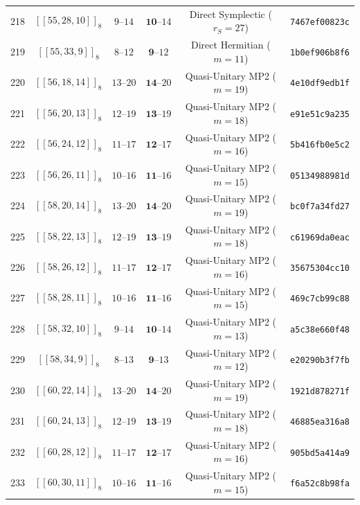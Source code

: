 \documentclass[11pt,a4paper]{article}
\theoremstyle{remark}
\begin{document}
{\begin{longtable}{@{}rccccl@{}}
218 & $[[55,28,10]]_{8}$ & $9\text{--}14$ & $\mathbf{10}\text{--}14$ & Direct Symplectic ($r_S=27$) & \texttt{7467ef00823c} \\
219 & $[[55,33,9]]_{8}$ & $8\text{--}12$ & $\mathbf{9}\text{--}12$ & Direct Hermitian ($m=11$) & \texttt{1b0ef906b8f6} \\
220 & $[[56,18,14]]_{8}$ & $13\text{--}20$ & $\mathbf{14}\text{--}20$ & Quasi-Unitary MP2 ($m=19$) & \texttt{4e10df9edb1f} \\
221 & $[[56,20,13]]_{8}$ & $12\text{--}19$ & $\mathbf{13}\text{--}19$ & Quasi-Unitary MP2 ($m=18$) & \texttt{e91e51c9a235} \\
222 & $[[56,24,12]]_{8}$ & $11\text{--}17$ & $\mathbf{12}\text{--}17$ & Quasi-Unitary MP2 ($m=16$) & \texttt{5b416fb0e5c2} \\
223 & $[[56,26,11]]_{8}$ & $10\text{--}16$ & $\mathbf{11}\text{--}16$ & Quasi-Unitary MP2 ($m=15$) & \texttt{05134988981d} \\
224 & $[[58,20,14]]_{8}$ & $13\text{--}20$ & $\mathbf{14}\text{--}20$ & Quasi-Unitary MP2 ($m=19$) & \texttt{bc0f7a34fd27} \\
225 & $[[58,22,13]]_{8}$ & $12\text{--}19$ & $\mathbf{13}\text{--}19$ & Quasi-Unitary MP2 ($m=18$) & \texttt{c61969da0eac} \\
226 & $[[58,26,12]]_{8}$ & $11\text{--}17$ & $\mathbf{12}\text{--}17$ & Quasi-Unitary MP2 ($m=16$) & \texttt{35675304cc10} \\
227 & $[[58,28,11]]_{8}$ & $10\text{--}16$ & $\mathbf{11}\text{--}16$ & Quasi-Unitary MP2 ($m=15$) & \texttt{469c7cb99c88} \\
228 & $[[58,32,10]]_{8}$ & $9\text{--}14$ & $\mathbf{10}\text{--}14$ & Quasi-Unitary MP2 ($m=13$) & \texttt{a5c38e660f48} \\
229 & $[[58,34,9]]_{8}$ & $8\text{--}13$ & $\mathbf{9}\text{--}13$ & Quasi-Unitary MP2 ($m=12$) & \texttt{e20290b3f7fb} \\
230 & $[[60,22,14]]_{8}$ & $13\text{--}20$ & $\mathbf{14}\text{--}20$ & Quasi-Unitary MP2 ($m=19$) & \texttt{1921d878271f} \\
231 & $[[60,24,13]]_{8}$ & $12\text{--}19$ & $\mathbf{13}\text{--}19$ & Quasi-Unitary MP2 ($m=18$) & \texttt{46885ea316a8} \\
232 & $[[60,28,12]]_{8}$ & $11\text{--}17$ & $\mathbf{12}\text{--}17$ & Quasi-Unitary MP2 ($m=16$) & \texttt{905bd5a414a9} \\
233 & $[[60,30,11]]_{8}$ & $10\text{--}16$ & $\mathbf{11}\text{--}16$ & Quasi-Unitary MP2 ($m=15$) & \texttt{f6a52c8b98fa} \\

\end{longtable}}
\end{document}
